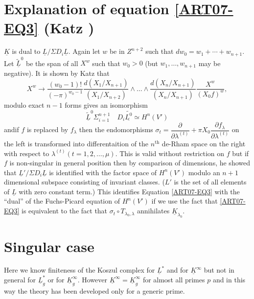 \section{Explanation of equation \texorpdfstring{\eqref{ART07-EQ3}}{eq3} (Katz \texorpdfstring{\cite{ART07-KEY5}}{key5})}\label{art07-sec3}

$\underline{K}$ is dual to $\underline{L}/\Sigma D_{i}\underline{L}$. Again let $w$ be in $Z^{n+2}$ such that $dw_{0}=w_{1}+\cdots+w_{n+1}$. Let $\widetilde{\underline{L}}^{0}$ be the span of all $X^{w}$ such that $w_{0}>0$ (but $w_{1},\ldots,w_{n+1}$ may be negative). It is shown by Katz that
$$
X^{w}\to \dfrac{(w_{0}-1)!}{(-\pi)^{w_{0}-1}}\dfrac{d(X_{1}/X_{n+1})}{(X_{1}/X_{n+2})}\wedge\ldots\wedge\dfrac{d(X_{n}/X_{n+1})}{(X_{n}/X_{n+1})}\dfrac{X^{w}}{(X_{0}f)^{w}},
$$
modulo exact $n-1$ forms gives an isomorphism
$$
\widetilde{\underline{L}}^{0}\Sigma^{n+1}_{i=1}\quad D_{i}\widetilde{\underline{L^{0}}}\simeq H^{n}(V')
$$
and\pageoriginale if $f$ is replaced by $f_{\lambda}$ then the endomorphisms $\sigma_{t}=\dfrac{\partial}{\partial \lambda^{(t)}}+\pi X_{0}\dfrac{\partial f_{\lambda}}{\partial \lambda^{(t)}}$ on the left is transformed into differentaition of the $n^{\text{th}}$ de-Rham space on the right with respect to $\lambda^{(t)}(t=1,2,\ldots,\mu)$. This is valid without restriction on $f$ but if $f$ is non-singular in general position then by comparison of dimensions, he showed that $\underline{L}'/\Sigma D_{i}\underline{L}$ is identified with the factor space of $H^{n}(V')$ modulo an $n+1$ dimensional subspace consisting of invariant classes. ($L'$ is the set of all elements of $\underline{L}$ with zero constant term.) This identifies Equation \eqref{ART07-EQ3} with the ``dual'' of the Fuchs-Picard equation of $H^{n}(V')$ if we use the fact that \eqref{ART07-EQ3} is equivalent to the fact that $\sigma_{t}\circ T_{\lambda_{0},\lambda}$ annihilates $\underline{K}_{\lambda_{0}}$.

\section{Singular case \texorpdfstring{\cite{ART07-KEY3}}{key3}}\label{art07-sec4}

Here we know finiteness of the Koszul complex for $\underline{L}^{*}$ and for $\underline{K}^{\infty}$ but not in general for $\underline{L}^{*}_{g}$ or for $\underline{K}^{\infty}_{g}$. However $\underline{K}^{\infty}=\underline{K}^{\infty}_{g}$ for almost all primes $p$ and in this way the theory has been developed only for a generic prime.


